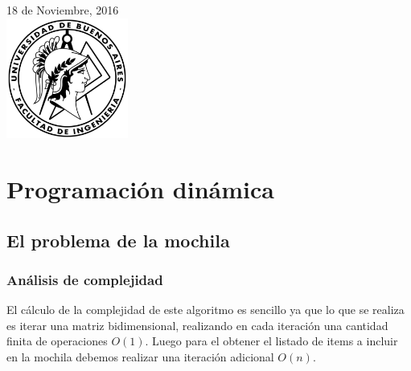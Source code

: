 \begin{titlepage}


{\large 18 de Noviembre, 2016}\\[1cm] %


\includegraphics[width=0.3\textwidth]{FIUBA.png}\\[0.8cm] %
 

\vfill %

\end{titlepage}

\tableofcontents
\newpage

\section{Programación dinámica}
\subsection{El problema de la mochila}
\subsubsection{Análisis de complejidad}
El cálculo de la complejidad de este algoritmo es sencillo ya que lo que se realiza es iterar una matriz bidimensional, realizando en cada iteración una cantidad finita de 
operaciones $O(1)$.
Luego para el obtener el listado de items a incluir en la mochila debemos realizar una iteración adicional $O(n)$.

